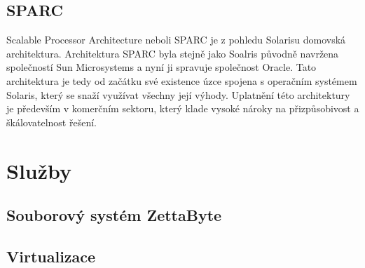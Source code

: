 \subsection{SPARC}

Scalable Processor Architecture neboli SPARC je z pohledu Solarisu domovská architektura. Architektura SPARC byla stejně jako Soalris původně navržena společností Sun Microsystems a nyní ji spravuje společnost Oracle. Tato architektura
je tedy od začátku své existence úzce spojena s operačním systémem Solaris, který se snaží využívat všechny její výhody. Uplatnění této architektury je především v komerčním sektoru, který klade vysoké nároky na přizpůsobivost a škálovatelnost řešení.

\section{Služby}

\subsection{Souborový systém ZettaByte}

\subsection{Virtualizace}